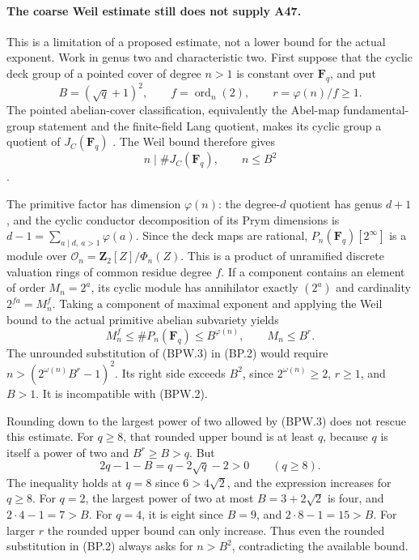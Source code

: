 \paragraph{The coarse Weil estimate still does not supply A47.}
This is a limitation of a proposed estimate, not a lower bound
for the actual exponent. Work in genus two and characteristic
two. First suppose that the cyclic deck group of a pointed
cover of degree $n>1$ is constant over $\mathbf F_q$, and put
\[
 B=(\sqrt q+1)^2,\qquad f=\operatorname{ord}_n(2),
                         \qquad r=\varphi(n)/f\ge1.
 \tag{BPW.1}
\]
The pointed abelian-cover classification, equivalently the
Abel-map fundamental-group statement and the finite-field
Lang quotient, makes its cyclic group a quotient of
$J_C(\mathbf F_q)$ \cite[Proposition~9.1]{MilneJV}.
The Weil bound therefore gives
\[
                  n\mid\#J_C(\mathbf F_q),\qquad n\le B^2
 \tag{BPW.2}
\]
\cite[Theorem~19.1]{MilneAV}.

The primitive factor has dimension $\varphi(n)$: the
degree-$d$ quotient has genus $d+1$, and the cyclic conductor
decomposition of its Prym dimensions is
$d-1=\sum_{a\mid d,\ a>1}\varphi(a)$.
Since the deck maps are rational, $P_n(\mathbf F_q)[2^\infty]$
is a module over
$\mathcal O_n=\mathbf Z_2[Z]/\Phi_n(Z)$.
This is a product of unramified discrete valuation rings of
common residue degree $f$. If a component contains an element
of order $M_n=2^a$, its cyclic module has annihilator exactly
$(2^a)$ and cardinality $2^{fa}=M_n^f$.
Taking a component of maximal exponent and applying the Weil
bound to the actual primitive abelian subvariety yields
\[
 M_n^f\le\#P_n(\mathbf F_q)\le B^{\varphi(n)},
                         \qquad M_n\le B^r.
 \tag{BPW.3}
\]
The unrounded substitution of (BPW.3) in (BP.2) would require
$n>(2^{\omega(n)}B^r-1)^2$. Its right side exceeds $B^2$,
since $2^{\omega(n)}\ge2$, $r\ge1$, and $B>1$.
It is incompatible with (BPW.2).

Rounding down to the largest power of two allowed by (BPW.3)
does not rescue this estimate. For $q\ge8$, that rounded
upper bound is at least $q$, because $q$ is itself a power
of two and $B^r\ge B>q$. But
\[
           2q-1-B=q-2\sqrt q-2>0\qquad(q\ge8).
 \tag{BPW.4}
\]
The inequality holds at $q=8$ since $6>4\sqrt2$, and the
expression increases for $q\ge8$. For $q=2$, the largest
power of two at most $B=3+2\sqrt2$ is four, and
$2\cdot4-1=7>B$. For $q=4$, it is eight since $B=9$,
and $2\cdot8-1=15>B$.
For larger $r$ the rounded upper bound can only increase.
Thus even the rounded substitution in (BP.2) always asks for
$n>B^2$, contradicting the available bound.

